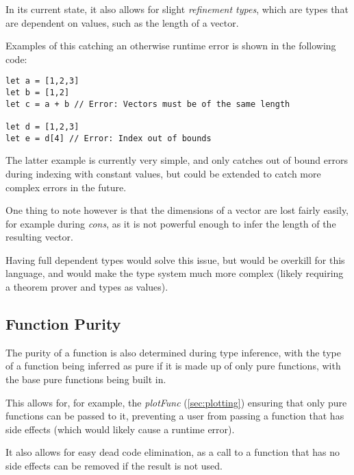 In its current state, it also allows for slight \textit{refinement types}\citep{freeman1991refinement}, which are types that are dependent on values, such as the length of a vector.

Examples of this catching an otherwise runtime error is shown in the following code:

\begin{verbatim}
let a = [1,2,3]
let b = [1,2]
let c = a + b // Error: Vectors must be of the same length
    
let d = [1,2,3]
let e = d[4] // Error: Index out of bounds
\end{verbatim}

The latter example is currently very simple, and only catches out of bound errors during indexing with constant 
values, but could be extended to catch more complex errors in the future.
    
One thing to note however is that the dimensions of a vector are lost fairly easily, for example during 
\textit{cons}, as it is not powerful enough to infer the length of the resulting vector.

Having full dependent types would solve this issue, but would be overkill for this language, and would make the
type system much more complex (likely requiring a theorem prover and types as values).

\subsection{Function Purity}\label{subsec:function-purity}

The purity of a function is also determined during type inference, with the type of a function being inferred as
pure if it is made up of only pure functions, with the base pure functions being built in.

This allows for, for example, the \textit{plotFunc} (\ref{sec:plotting}) ensuring that only pure functions can be 
passed to it, preventing a user from passing a function that has side effects (which would likely cause a runtime error).

It also allows for easy dead code elimination, as a call to a function that has no side effects can be removed if the
result is not used.
